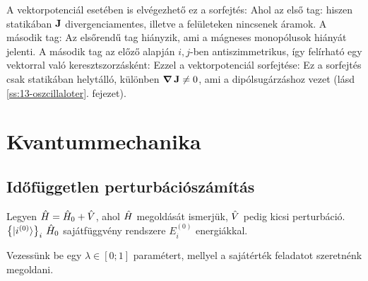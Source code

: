    A vektorpotenciál esetében is elvégezhető ez a sorfejtés: 
   Ahol az első tag:
   hiszen statikában $\mathbf{J}$ divergenciamentes, illetve a felületeken nincsenek áramok. A második tag:
   Az elsőrendű tag hiányzik, ami a mágneses monopólusok hiányát jelenti. A második tag az előző alapján $i,j$-ben antiszimmetrikus, így felírható egy vektorral való keresztszorzásként:
   Ezzel a vektorpotenciál sorfejtése:
   Ez a sorfejtés csak statikában helytálló, különben $\mathop{\boldsymbol{\nabla}}\nolimits \mathbf{J} \ne 0$, ami a dipólsugárzáshoz vezet (lásd \ref{ss:13-oszcillaloter}. fejezet). 
   
 \section{Kvantummechanika}
  
  \subsection{Időfüggetlen perturbációszámítás}
   
   Legyen $\hat{H}=\hat{H}_0+\hat{V}$, ahol $\hat{H}$ megoldását ismerjük, $\hat{V}$ pedig kicsi perturbáció. $\big\{\lvert i^{(0)}\rangle\big\}_{i}$ $\hat{H}_0$ sajátfüggvény rendszere $E_i^{(0)}$ energiákkal.
   
   Vezessünk be egy $\lambda\in[0;1]$ paramétert, mellyel a 
   sajátérték feladatot szeretnénk megoldani.
   

